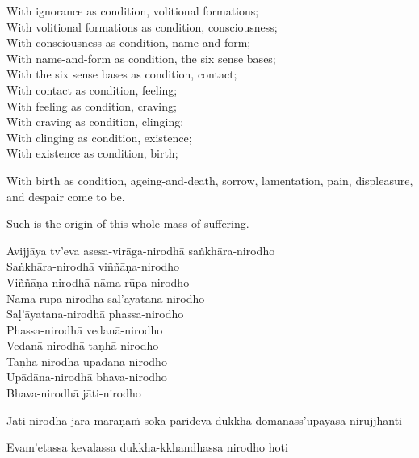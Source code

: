 \begin{english-verses}
  With ignorance as condition, volitional formations;\\
  With volitional formations as condition, consciousness;\\
  With consciousness as condition, name-and-form;\\
  With name-and-form as condition, the six sense bases;\\
  With the six sense bases as condition, contact;\\
  With contact as condition, feeling;\\
  With feeling as condition, craving;\\
  With craving as condition, clinging;\\
  With clinging as condition, existence;\\
  With existence as condition, birth;
  \begin{english-hangtogether-verses}
    With birth as condition, ageing-and-death, sorrow, lamentation, pain, displeasure, and despair come to be.
  \end{english-hangtogether-verses}
  \begin{english-hangtogether-verses}
    Such is the origin of this whole mass of suffering.
  \end{english-hangtogether-verses}
\end{english-verses}

\begin{pali-hang-continued}
  Avijjāya tv'eva asesa-virāga-nirodhā saṅkhāra-nirodho\\
  Saṅkhāra-nirodhā viññāṇa-nirodho\\
  Viññāṇa-nirodhā nāma-rūpa-nirodho\\
  Nāma-rūpa-nirodhā saḷ'āyatana-nirodho\\
  Saḷ'āyatana-nirodhā phassa-nirodho\\
  Phassa-nirodhā vedanā-nirodho\\
  Vedanā-nirodhā taṇhā-nirodho\\
  Taṇhā-nirodhā upādāna-nirodho\\
  Upādāna-nirodhā bhava-nirodho\\
  Bhava-nirodhā jāti-nirodho
  \begin{pali-hangtogether}
    Jāti-nirodhā jarā-maraṇaṁ soka-parideva-dukkha-domanass'upāyāsā nirujjhanti
  \end{pali-hangtogether}
  \begin{pali-hangtogether}
    Evam'etassa kevalassa dukkha-kkhandhassa nirodho hoti
  \end{pali-hangtogether}
\end{pali-hang-continued}

